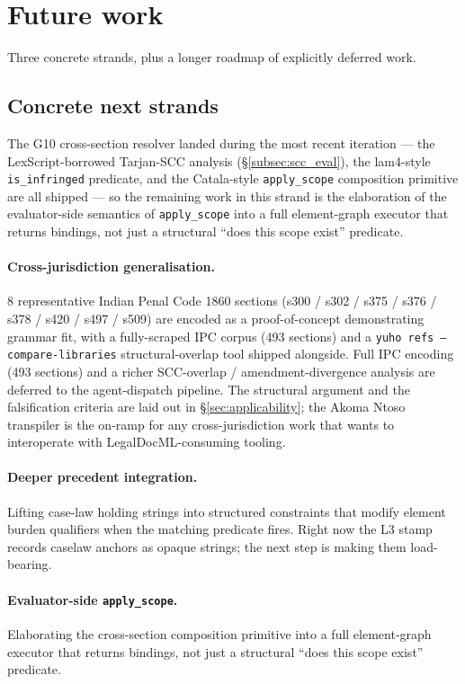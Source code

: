 \section{Future work}
\label{sec:future_work}

Three concrete strands, plus a longer roadmap of explicitly deferred
work.

\subsection{Concrete next strands}
\label{subsec:future_concrete}

The \textsf{G10} cross-section resolver landed during the most
recent iteration --- the LexScript-borrowed Tarjan-SCC analysis
(\S\ref{subsec:scc_eval}), the lam4-style \texttt{is\_infringed}
predicate, and the Catala-style \texttt{apply\_scope} composition
primitive are all shipped --- so the remaining work in this strand
is the elaboration of the evaluator-side semantics of
\texttt{apply\_scope} into a full element-graph executor that returns
bindings, not just a structural ``does this scope exist'' predicate.

\paragraph{Cross-jurisdiction generalisation.} 8 representative
Indian Penal Code 1860 sections (s300 / s302 / s375 / s376 / s378 /
s420 / s497 / s509) are encoded as a proof-of-concept demonstrating
grammar fit, with a fully-scraped IPC corpus (493 sections) and a
\texttt{yuho refs --compare-libraries} structural-overlap tool
shipped alongside. Full IPC encoding (493 sections) and a richer
SCC-overlap / amendment-divergence analysis are deferred to the
agent-dispatch pipeline. The structural argument and the
falsification criteria are laid out in \S\ref{sec:applicability};
the Akoma Ntoso transpiler is the on-ramp for any cross-jurisdiction
work that wants to interoperate with LegalDocML-consuming tooling.

\paragraph{Deeper precedent integration.} Lifting case-law holding
strings into structured constraints that modify element burden
qualifiers when the matching predicate fires. Right now the L3
stamp records caselaw anchors as opaque strings; the next step is
making them load-bearing.

\paragraph{Evaluator-side \texttt{apply\_scope}.} Elaborating the
cross-section composition primitive into a full element-graph
executor that returns bindings, not just a structural ``does this
scope exist'' predicate.

